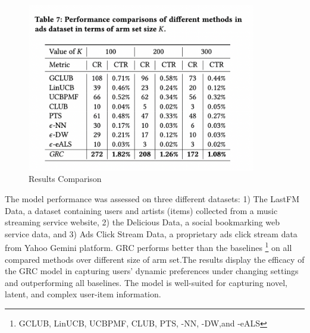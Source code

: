 \begin{figure}[hh!]
    \centering
    \includegraphics[width=100mm]{results_GRC.png}
    \caption{Results Comparison
    \label{overflow}}
\end{figure}
The model performance was assessed on three different datasets: 1) The LastFM Data, a dataset containing  users and artists (items) collected from a music streaming service website, 2) the Delicious Data, a social bookmarking web service data, and 3) Ads Click Stream Data, a proprietary ads click stream data from Yahoo Gemini platform. GRC performs better than the baselines \footnote {GCLUB, LinUCB, UCBPMF, CLUB, PTS, \textepsilon-NN, \textepsilon-DW,and \textepsilon-eALS} on all compared methods over different size of arm set.The results display the efficacy of the GRC model in capturing users’ dynamic preferences under changing settings and outperforming all baselines. The model is well-suited for capturing novel, latent, and complex user-item information.

